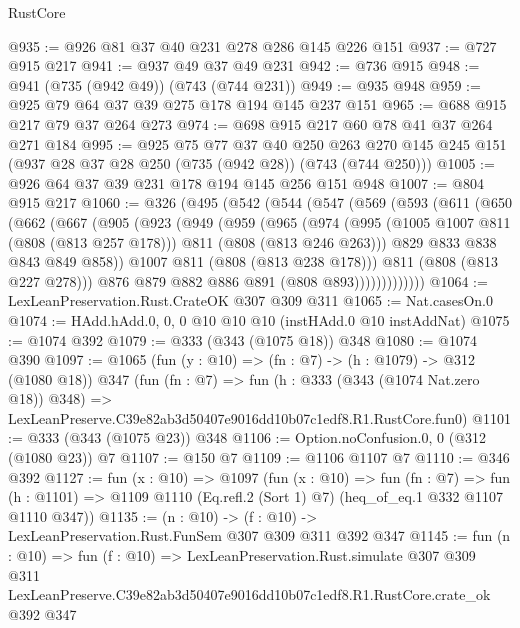 \begin{lexlean}{RustCore}
\begin{coremodule}
@935 := @926 @81 @37 @40 @231 @278 @286 @145 @226 @151
@937 := @727 @915 @217
@941 := @937 @49 @37 @49 @231
@942 := @736 @915
@948 := @941 (@735 (@942 @49)) (@743 (@744 @231))
@949 := @935 @948
@959 := @925 @79 @64 @37 @39 @275 @178 @194 @145 @237 @151
@965 := @688 @915 @217 @79 @37 @264 @273
@974 := @698 @915 @217 @60 @78 @41 @37 @264 @271 @184
@995 := @925
    @75
    @77
    @37
    @40
    @250
    @263
    @270
    @145
    @245
    @151
    (@937 @28 @37 @28 @250 (@735 (@942 @28)) (@743 (@744 @250)))
@1005 := @926 @64 @37 @39 @231 @178 @194 @145 @256 @151 @948
@1007 := @804 @915 @217
@1060 := @326
    (@495
      (@542
        (@544
          (@547
            (@569
              (@593
                (@611
                  (@650
                    (@662
                      (@667
                        (@905
                          (@923
                            (@949
                              (@959
                                (@965
                                  (@974
                                    (@995
                                      (@1005 @1007 @811 (@808 (@813 @257 @178)))
                                      @811
                                      (@808 (@813 @246 @263)))
                                    @829
                                    @833
                                    @838
                                    @843
                                    @849
                                    @858))
                                @1007
                                @811
                                (@808 (@813 @238 @178)))
                              @811
                              (@808 (@813 @227 @278)))
                            @876
                            @879
                            @882
                            @886
                            @891
                            (@808 @893)))))))))))))
@1064 := LexLeanPreservation.Rust.CrateOK @307 @309 @311
@1065 := Nat.casesOn.{0}
@1074 := HAdd.hAdd.{0, 0, 0} @10 @10 @10 (instHAdd.{0} @10 instAddNat)
@1075 := @1074 @392
@1079 := @333 (@343 (@1075 @18)) @348
@1080 := @1074 @390
@1097 := @1065
    (fun (y : @10) => (fn : @7) -> (h : @1079) -> @312 (@1080 @18))
    @347
    (fun (fn : @7) =>
    fun (h : @333 (@343 (@1074 Nat.zero @18)) @348) =>
    LexLeanPreserve.C39e82ab3d50407e9016dd10b07c1edf8.R1.RustCore.fun0)
@1101 := @333 (@343 (@1075 @23)) @348
@1106 := Option.noConfusion.{0, 0} (@312 (@1080 @23)) @7
@1107 := @150 @7
@1109 := @1106 @1107 @7
@1110 := @346 @392
@1127 := fun (x : @10) =>
  @1097
    (fun (x : @10) =>
    fun (fn : @7) =>
    fun (h : @1101) => @1109 @1110 (Eq.refl.{2} (Sort 1) @7) (heq_of_eq.{1} @332 @1107 @1110 @347))
@1135 := (n : @10) -> (f : @10) -> LexLeanPreservation.Rust.FunSem @307 @309 @311 @392 @347
@1145 := fun (n : @10) =>
  fun (f : @10) =>
  LexLeanPreservation.Rust.simulate
    @307
    @309
    @311
    LexLeanPreserve.C39e82ab3d50407e9016dd10b07c1edf8.R1.RustCore.crate_ok
    @392
    @347
\end{coremodule}
\end{lexlean}
